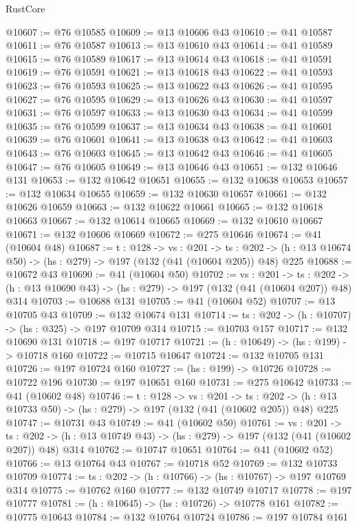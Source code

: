\begin{lexlean}{RustCore}
\begin{coremodule}
@10607 := @76 @10585
@10609 := @13 @10606 @43
@10610 := @41 @10587
@10611 := @76 @10587
@10613 := @13 @10610 @43
@10614 := @41 @10589
@10615 := @76 @10589
@10617 := @13 @10614 @43
@10618 := @41 @10591
@10619 := @76 @10591
@10621 := @13 @10618 @43
@10622 := @41 @10593
@10623 := @76 @10593
@10625 := @13 @10622 @43
@10626 := @41 @10595
@10627 := @76 @10595
@10629 := @13 @10626 @43
@10630 := @41 @10597
@10631 := @76 @10597
@10633 := @13 @10630 @43
@10634 := @41 @10599
@10635 := @76 @10599
@10637 := @13 @10634 @43
@10638 := @41 @10601
@10639 := @76 @10601
@10641 := @13 @10638 @43
@10642 := @41 @10603
@10643 := @76 @10603
@10645 := @13 @10642 @43
@10646 := @41 @10605
@10647 := @76 @10605
@10649 := @13 @10646 @43
@10651 := @132 @10646 @131
@10653 := @132 @10642 @10651
@10655 := @132 @10638 @10653
@10657 := @132 @10634 @10655
@10659 := @132 @10630 @10657
@10661 := @132 @10626 @10659
@10663 := @132 @10622 @10661
@10665 := @132 @10618 @10663
@10667 := @132 @10614 @10665
@10669 := @132 @10610 @10667
@10671 := @132 @10606 @10669
@10672 := @275 @10646
@10674 := @41 (@10604 @48)
@10687 := {t : @128} ->
  {vs : @201} ->
  {ts : @202} -> (h : @13 @10674 @50) -> (hs : @279) -> @197 (@132 (@41 (@10604 @205)) @48) @225
@10688 := @10672 @43
@10690 := @41 (@10604 @50)
@10702 := {vs : @201} ->
  {ts : @202} -> (h : @13 @10690 @43) -> (hs : @279) -> @197 (@132 (@41 (@10604 @207)) @48) @314
@10703 := @10688 @131
@10705 := @41 (@10604 @52)
@10707 := @13 @10705 @43
@10709 := @132 @10674 @131
@10714 := {ts : @202} -> (h : @10707) -> (hs : @325) -> @197 @10709 @314
@10715 := @10703 @157
@10717 := @132 @10690 @131
@10718 := @197 @10717
@10721 := (h : @10649) -> (hs : @199) -> @10718 @160
@10722 := @10715 @10647
@10724 := @132 @10705 @131
@10726 := @197 @10724 @160
@10727 := (hs : @199) -> @10726
@10728 := @10722 @196
@10730 := @197 @10651 @160
@10731 := @275 @10642
@10733 := @41 (@10602 @48)
@10746 := {t : @128} ->
  {vs : @201} ->
  {ts : @202} -> (h : @13 @10733 @50) -> (hs : @279) -> @197 (@132 (@41 (@10602 @205)) @48) @225
@10747 := @10731 @43
@10749 := @41 (@10602 @50)
@10761 := {vs : @201} ->
  {ts : @202} -> (h : @13 @10749 @43) -> (hs : @279) -> @197 (@132 (@41 (@10602 @207)) @48) @314
@10762 := @10747 @10651
@10764 := @41 (@10602 @52)
@10766 := @13 @10764 @43
@10767 := @10718 @52
@10769 := @132 @10733 @10709
@10774 := {ts : @202} -> (h : @10766) -> (hs : @10767) -> @197 @10769 @314
@10775 := @10762 @160
@10777 := @132 @10749 @10717
@10778 := @197 @10777
@10781 := (h : @10645) -> (hs : @10726) -> @10778 @161
@10782 := @10775 @10643
@10784 := @132 @10764 @10724
@10786 := @197 @10784 @161

\end{coremodule}
\end{lexlean}
